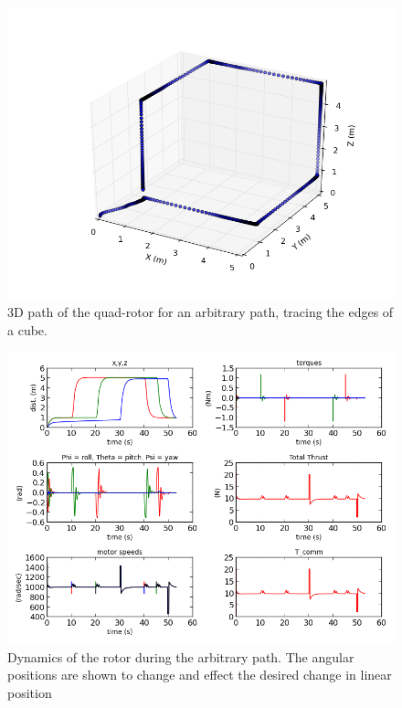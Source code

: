\begin{figure}[htbp]
	\centering
		\includegraphics[scale = 0.4]{Figures/CubeEdges3D.png}
	\caption[3D path of the quad-rotor for an arbitrary path, tracing the edges of a cube.]{3D path of the quad-rotor for an arbitrary path, tracing the edges of a cube.}
	\label{fig:Cube Edges 3D}
\end{figure}
\begin{figure}[htbp]
	\centering
		\includegraphics[scale = 0.5]{Figures/CubeEdgesGraphs.png}
	\caption[Dynamics of the rotor during the arbitrary path. The angular positions are shown to change and effect the desired change in linear position]{Dynamics of the rotor during the arbitrary path. The angular positions are shown to change and effect the desired change in linear position}
	\label{fig:Cube Edges Time Domain}
\end{figure}
